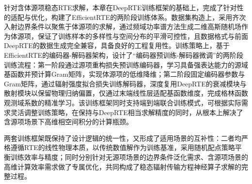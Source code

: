针对含体源项稳态RTE求解，本章在DeepRTE训练框架的基础上，完成了针对性的适配与优化，构建了EfficientRTE的两阶段训练体系。数据集构造上，采用齐次入射边界条件以聚焦于体源项的求解，通过频域功率谱方法生成二维高斯随机场作为体源项，保证了训练样本的多样性与空间分布的平滑可控性，且数据格式与前面DeepRTE的数据生成完全兼容，具备良好的工程复用性。训练策略上，基于EfficientRTE的编码器-解码器架构，设计了“编码器预训练-解码器微调”的两阶段训练流程：第一阶段通过源项重构损失预训练编码器，学习具备强表达能力的源域基函数并预计算Gram矩阵，实现体源项的低维降维；第二阶段固定编码器参数与Gram矩阵，通过辐射强度拟合损失训练解码器，深度复用DeepRTE的衰减模块与散射模块以保留物理归纳偏置，仅通过末端线性层适配基函数维度，完成格林函数观测域系数的精准学习。该训练框架同时支持端到端联合训练模式，可根据实际需求灵活调整训练策略，在保持与DeepRTE相当求解精度的同时，从根本上解决了含源项场景下高维相空间积分的计算瓶颈。

两套训练框架既保持了设计逻辑的统一性，又形成了适用场景的互补性：二者均严格遵循RTE的线性物理本质，以传统数值解作为训练基准，采用随机配点策略平衡训练效率与精度；同时分别针对无源项场景的边界条件泛化需求、含源项场景的高维计算效率需求做了专属优化，共同构成了稳态辐射传输方程神经算子求解的完整过程。